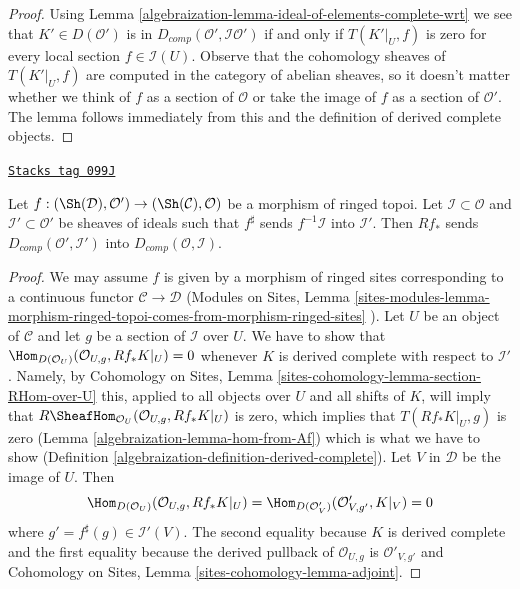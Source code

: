 \begin{proof}

Using Lemma \ref{algebraization-lemma-ideal-of-elements-complete-wrt}
we see that $K' \in D(\mathcal{O}')$ is in
$D_{comp}(\mathcal{O}', \mathcal{I}\mathcal{O}')$
if and only if $T(K'|_U, f)$ is zero for every local section
$f \in \mathcal{I}(U)$. Observe that the cohomology sheaves of
$T(K'|_U, f)$ are computed in the category of abelian sheaves,
so it doesn't matter whether we think of $f$ as a section of
$\mathcal{O}$ or take the image of $f$ as a section of $\mathcal{O}'$.
The lemma follows immediately from this and the
definition of derived complete objects.
\end{proof}

\begin{lemma}
\label{algebraization-lemma-pushforward-derived-complete}
\href{https://stacks.math.columbia.edu/tag/099J}{\texttt{Stacks tag 099J}}

Let $f : (\Sh(\mathcal{D}), \mathcal{O}') \to (\Sh(\mathcal{C}), \mathcal{O})$
be a morphism of ringed topoi. Let $\mathcal{I} \subset \mathcal{O}$
and $\mathcal{I}' \subset \mathcal{O}'$ be sheaves of ideals such
that $f^\sharp$ sends $f^{-1}\mathcal{I}$ into $\mathcal{I}'$.
Then $Rf_*$ sends $D_{comp}(\mathcal{O}', \mathcal{I}')$
into $D_{comp}(\mathcal{O}, \mathcal{I})$.
\end{lemma}

\begin{proof}

We may assume $f$ is given by a morphism of ringed sites corresponding
to a continuous functor $\mathcal{C} \to \mathcal{D}$
(Modules on Sites, Lemma
\ref{sites-modules-lemma-morphism-ringed-topoi-comes-from-morphism-ringed-sites}
).
Let $U$ be an object of $\mathcal{C}$ and let $g$ be a section of
$\mathcal{I}$ over $U$. We have to show that
$\Hom_{D(\mathcal{O}_U)}(\mathcal{O}_{U, g}, Rf_*K|_U) = 0$
whenever $K$ is derived complete with respect to $\mathcal{I}'$.
Namely, by Cohomology on Sites, Lemma
\ref{sites-cohomology-lemma-section-RHom-over-U}
this, applied to all objects over $U$ and all shifts of $K$,
will imply that $R\SheafHom_{\mathcal{O}_U}(\mathcal{O}_{U, g}, Rf_*K|_U)$
is zero, which implies that $T(Rf_*K|_U, g)$ is zero
(Lemma \ref{algebraization-lemma-hom-from-Af}) which is what we have to show
(Definition \ref{algebraization-definition-derived-complete}).
Let $V$ in $\mathcal{D}$ be the image of $U$. Then
$$
\Hom_{D(\mathcal{O}_U)}(\mathcal{O}_{U, g}, Rf_*K|_U) =
\Hom_{D(\mathcal{O}'_V)}(\mathcal{O}'_{V, g'}, K|_V) = 0
$$
where $g' = f^\sharp(g) \in \mathcal{I}'(V)$. The second equality
because $K$ is derived complete and the first equality because
the derived pullback of $\mathcal{O}_{U, g}$ is $\mathcal{O}'_{V, g'}$
and
Cohomology on Sites, Lemma \ref{sites-cohomology-lemma-adjoint}.
\end{proof}

